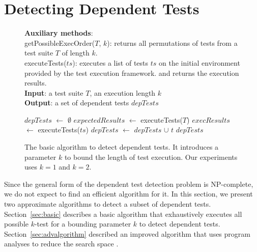 \section{Detecting Dependent Tests}
\label{sec:detecting}

\newcommand{\testlist}[0]{\ensuremath{T^k_i}}
\newcommand{\executeTestsInOrder}[1]{\result{#1}{\env_0}}

\begin{figure}[t]
\textbf{Auxiliary methods}:\\
getPossibleExecOrder($T$, $k$): returns all permutations of tests from a test suite $T$ of length $k$.\\
executeTests($ts$): executes a list of tests $ts$ 
on the initial environment provided by the test execution framework.
and returns the execution results.\\
\textbf{Input}: a test suite $\mathit{T}$, an execution length $\mathit{k}$\\
\textbf{Output}: a set of dependent tests $\mathit{depTests}$\\
\vspace{-5mm}
\begin{algorithmic}[1]
\STATE $\mathit{depTests}$ $\leftarrow$ $\emptyset$
\STATE $\mathit{expectedResults}$ $\leftarrow$ executeTests($T$)
\STATE $\mathit{execResults}$ $\leftarrow$ executeTests($ts$)
\STATE $\mathit{depTests}$ $\leftarrow$ $\mathit{depTests}$ $\cup$ $\mathit{t}$
\ENDIF
\ENDFOR
\ENDFOR
\RETURN $\mathit{depTests}$
\end{algorithmic}
\vspace{-3mm}
\caption {The basic algorithm to detect dependent tests.
It introduces a parameter $k$ to bound the length of
test execution. Our experiments uses $k=1$ and $k=2$. } 
\label{fig:dtalgorithm}
\end{figure}

Since the general form of the dependent test detection problem is
NP-complete, we do not expect to find an efficient algorithm for it.
In this section, we present two approximate algorithms to detect
a subset of dependent tests. 
Section~\ref{sec:basic} describes a basic algorithm that
exhaustively executes all possible $k$-test for a bounding parameter $k$
to detect dependent
tests. Section~\ref{sec:advalgorithm} described an improved algorithm
that uses program analyses to reduce the search space
.


